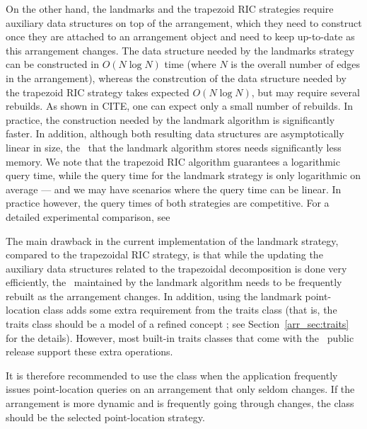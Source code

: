 On the other hand, the landmarks and the trapezoid RIC strategies
require auxiliary data structures on top of the arrangement, which
they need to construct once they are attached to an arrangement
object and need to keep up-to-date as this arrangement changes.
The data structure needed by the landmarks strategy can be constructed
in $O(N \log N)$ time (where $N$ is the overall number of edges in
the arrangement), whereas the constrcution of the data structure needed 
by the trapezoid RIC strategy takes expected $O(N \log N)$, but 
may require several rebuilds. As shown in CITE, one can 
expect only a small number of rebuilds.
In practice, the construction needed by the landmark algorithm is
significantly faster. 
In addition, although both
resulting data structures are asymptotically linear in size, the
\kdtree\ that the landmark algorithm stores needs significantly
less memory. 
We note that the trapezoid RIC algorithm guarantees a
logarithmic query time, while the query time for the landmark
strategy is only logarithmic on average --- and we may have
scenarios where the query time can be linear. In practice however,
the query times of both strategies are competitive. For a detailed
experimental comparison, see \cite{cgal:hh-eplca-05}

The main drawback in the current implementation of the landmark
strategy, compared to the trapezoidal RIC strategy, is that while
the updating the auxiliary data structures
related to the trapezoidal decomposition is done very efficiently,
the \kdtree\ maintained by the landmark algorithm needs to be
frequently rebuilt as the arrangement changes. In addition, using
the landmark point-location class adds some extra requirement
from the traits class (that is, the traits class should be a model
of a refined concept ; see
Section~\ref{arr_sec:traits} for the details). However, most
built-in traits classes that come with the \cgal\ public release
support these extra operations.

It is therefore recommended to use the
 class when the application
frequently issues point-location queries on an
arrangement that only seldom changes. If the arrangement is more
dynamic and is frequently going through changes, the
 class should be the
selected point-location strategy.

